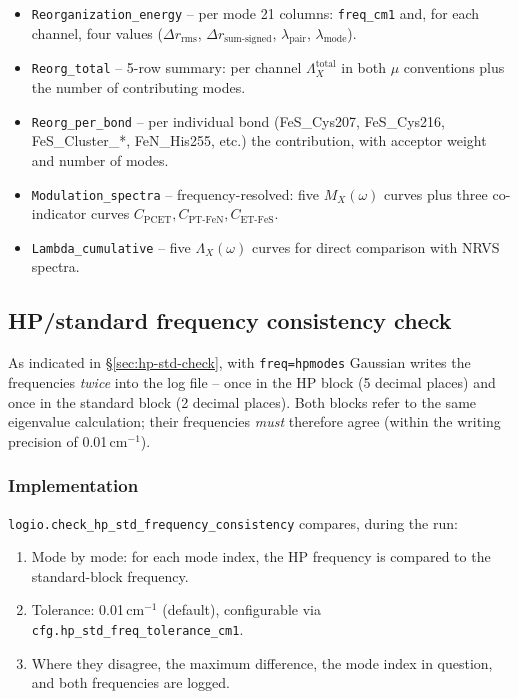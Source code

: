 \documentclass[11pt,a4paper,twoside]{article}
\theoremstyle{remark}
\begin{document}
\begin{itemize}
  \item \texttt{Reorganization\_energy} -- per mode 21 columns:
        \texttt{freq\_cm1} and, for each channel, four values
        ($\Delta r_\text{rms}$, $\Delta r_\text{sum-signed}$,
        $\lambda_\text{pair}$, $\lambda_\text{mode}$).

  \item \texttt{Reorg\_total} -- 5-row summary: per channel
        $\Lambda_X^\text{total}$ in both $\mu$ conventions plus
        the number of contributing modes.

  \item \texttt{Reorg\_per\_bond} -- per individual bond
        (FeS\_Cys207, FeS\_Cys216, FeS\_Cluster\_*, FeN\_His255,
        etc.) the contribution, with acceptor weight and number
        of modes.

  \item \texttt{Modulation\_spectra} -- frequency-resolved: five
        $M_X(\omega)$ curves plus three co-indicator curves
        $C_\text{PCET}, C_\text{PT-FeN}, C_\text{ET-FeS}$.

  \item \texttt{Lambda\_cumulative} -- five $\Lambda_X(\omega)$
        curves for direct comparison with NRVS spectra.
\end{itemize}


\subsection{HP/standard frequency consistency check}
\label{sec:hp-std}

As indicated in \S\ref{sec:hp-std-check}, with
\texttt{freq=hpmodes} Gaussian writes the frequencies
\emph{twice} into the log file -- once in the HP block (5 decimal
places) and once in the standard block (2 decimal places). Both
blocks refer to the same eigenvalue calculation; their frequencies
\emph{must} therefore agree (within the writing precision of
0.01\,cm$^{-1}$).

\subsubsection*{Implementation}

\texttt{logio.check\_hp\_std\_frequency\_consistency} compares,
during the run:

\begin{enumerate}
  \item Mode by mode: for each mode index, the HP frequency is
        compared to the standard-block frequency.
  \item Tolerance: 0.01\,cm$^{-1}$ (default), configurable via
        \texttt{cfg.hp\_std\_freq\_tolerance\_cm1}.
  \item Where they disagree, the maximum difference, the mode
        index in question, and both frequencies are logged.
\end{enumerate}
\end{document}
